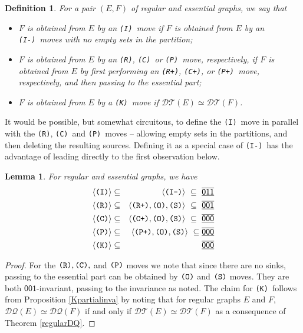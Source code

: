 \documentclass[12pt]{amsbook}%
\newtheorem{lemma}[theor]{Lemma}
\theoremstyle{defin}
\newtheorem{defin}[theor]{Definition}
\theoremstyle{remark}
\numberwithin{equation}{chapter}
\numberwithin{theor}{section}
\newcommand{\xyz}[1]{\mbox{$\mathsf{#1}$}}
\newcommand{\xyzrel}[1]{\mbox{$\overline{\underline{\mathsf{ #1}}}$}}
\newcommand{\III}{\mbox{\texttt{\textup{(I)}}}}
\newcommand{\IIIm}{\mbox{\texttt{\textup{(I-)}}}}
\newcommand{\OOO}{\mbox{\texttt{\textup{(O)}}}}
\newcommand{\CCC}{\mbox{\texttt{\textup{(C)}}}}
\newcommand{\CCCp}{\mbox{\texttt{\textup{(C+)}}}}
\newcommand{\RRR}{\mbox{\texttt{\textup{(R)}}}}
\newcommand{\RRRp}{\mbox{\texttt{\textup{(R+)}}}}
\newcommand{\PPP}{\mbox{\texttt{\textup{(P)}}}}
\newcommand{\PPPp}{\mbox{\texttt{\textup{(P+)}}}}
\newcommand{\KKK}{\mbox{\texttt{\textup{(K)}}}}
\newcommand{\SSS}{\mbox{\texttt{\textup{(S)}}}}
\newcommand{\DT}{\mathcal{DT}}
\newcommand{\DQ}{\mathcal{DQ}}
\begin{document}
 \begin{defin}
 For a pair $(E,F)$ of regular and essential graphs, we say that 
 \begin{itemize}
 \item $F$ is obtained from $E$ by an \III\ move if  $F$ is obtained from $E$ by an \IIIm\ moves with no empty sets in the partition;
 \item $F$ is obtained from $E$ by an \RRR, \CCC\ or \PPP\ move, respectively, if  $F$ is obtained from $E$ by first performing an \RRRp, \CCCp, or \PPPp\ move, respectively, and then passing to the essential part;
  \item $F$ is obtained from $E$ by a \KKK\ move if  $\DT(E)\simeq\DT(F)$.
 \end{itemize}
  \end{defin}
 
 It would be possible, but somewhat circuitous, to define the \III\ move in parallel with the \RRR, \CCC\ and \PPP\ moves -- allowing empty sets in the partitions, and then deleting the resulting sources. Defining it as a special case of \IIIm\ has the advantage of leading directly to the first observation below.
 
 \begin{lemma}\label{essinv} For regular and essential graphs, we have
 \begin{eqnarray*}
 \langle\III\rangle&\subseteq&\langle\IIIm\rangle\ \subseteq\ \xyzrel{011}\\
 \langle\RRR\rangle&\subseteq&\langle\RRRp,\OOO,\SSS\rangle\ \subseteq\ \xyzrel{001}\\ 
 \langle\CCC\rangle&\subseteq&\langle\CCCp,\OOO,\SSS\rangle\ \subseteq\ \xyzrel{000}\\ 
 \langle\PPP\rangle&\subseteq&\langle\PPPp,\OOO,\SSS\rangle\ \subseteq\xyzrel{000}\\ 
 \langle\KKK\rangle&\subseteq&\xyzrel{000}
 \end{eqnarray*}
  \end{lemma}  
 
 \begin{proof}
 For the $\RRR,\CCC,$ and $\PPP$ moves we note that since there are no sinks, passing to the essential part can be obtained by $\OOO$ and $\SSS$ moves. They are both $\xyz{001}$-invariant, passing to the invariance as noted. The claim for \KKK\ follows from Proposition \ref{Kpartialinva} by noting that for regular graphs $E$ and $F$, $\DQ(E) \simeq \DQ(F)$ if and only if $\DT(E)\simeq\DT(F)$ as a consequence of Theorem \ref{regularDQ}.
 \end{proof}
 
\end{document}
